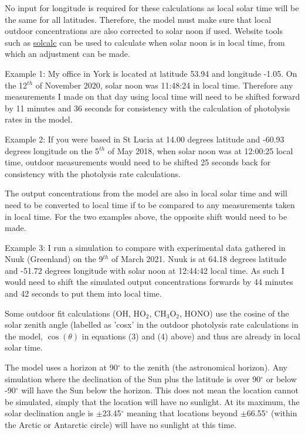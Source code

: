 \documentclass[a4paper]{refart}
\begin{document}
\label{Outdoor concentrations and time}

No input for longitude is required for these calculations as local solar time will be the same for all latitudes. Therefore, the model must make sure that local outdoor concentrations are also corrected to solar noon if used. Website tools such as \href{https://www.esrl.noaa.gov/gmd/grad/solcalc/}{solcalc} can be used to calculate when solar noon is in local time, from which an adjustment can be made. 

Example 1: My office in York is located at latitude 53.94 and longitude -1.05. On the 12$^{th}$ of November 2020, solar noon was 11:48:24 in local time. Therefore any measurements I made on that day using local time will need to be shifted forward by 11 minutes and 36 seconds for consistency with the calculation of photolysis rates in the model.

Example 2: If you were based in St Lucia at 14.00 degrees latitude and -60.93 degrees longitude on the 5$^{th}$ of May 2018, when solar noon was at 12:00:25 local time, outdoor measurements would need to be shifted 25 seconds back for consistency with the photolysis rate calculations.

The output concentrations from the model are also in local solar time and will need to be converted to local time if to be compared to any measurements taken in local time. For the two examples above, the opposite shift would need to be made. 

Example 3: I run a simulation to compare with experimental data gathered in Nuuk (Greenland) on the 9$^{th}$ of March 2021. Nuuk is at 64.18 degrees latitude and -51.72 degrees longitude with solar noon at 12:44:42 local time. As such I would need to shift the simulated output concentrations forwards by 44 minutes and 42 seconds to put them into local time.

Some outdoor fit calculations (OH, HO$_2$, CH$_3$O$_2$, HONO) use the cosine of the solar zenith angle (labelled as 'cosx' in the outdoor photolysis rate calculations in the model, $\cos(\theta)$ in equations (3) and (4) above) and thus are already in local solar time.


The model uses a horizon at 90$^{\circ}$ to the zenith (the astronomical horizon). Any simulation where the declination of the Sun plus the latitude is over 90$^{\circ}$ or below -90$^{\circ}$ will have the Sun below the horizon. This does not mean the location cannot be simulated, simply that the location will have no sunlight. At its maximum, the solar declination angle is $\pm$23.45$^{\circ}$ meaning that locations beyond $\pm$66.55$^{\circ}$ (within the Arctic or Antarctic circle) will have no sunlight at this time.
\end{document}
